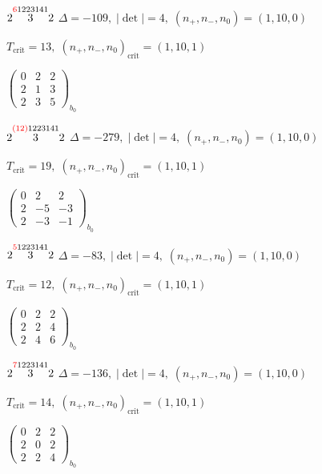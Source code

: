 \documentclass[10pt]{article}
\begin{document}
$2\overset{\textcolor{red}{6}1223141}{3}2$ \quad $\Delta=-109,\; |\det|=4,\; (n_+,n_-,n_0)=(1,10,0)$

\hspace{1em}$T_{\text{crit}}=13,\; (n_+,n_-,n_0)_{\text{crit}}=(1,10,1)$

\hspace{2em}$\left(\begin{smallmatrix}0 & 2 & 2 \\ 2 & 1 & 3 \\ 2 & 3 & 5\end{smallmatrix}\right)_{\!b_0}$

$2\overset{\textcolor{red}{(12)}1223141}{3}2$ \quad $\Delta=-279,\; |\det|=4,\; (n_+,n_-,n_0)=(1,10,0)$

\hspace{1em}$T_{\text{crit}}=19,\; (n_+,n_-,n_0)_{\text{crit}}=(1,10,1)$

\hspace{2em}$\left(\begin{smallmatrix}0 & 2 & 2 \\ 2 & -5 & -3 \\ 2 & -3 & -1\end{smallmatrix}\right)_{\!b_0}$

$2\overset{\textcolor{red}{5}1223141}{3}2$ \quad $\Delta=-83,\; |\det|=4,\; (n_+,n_-,n_0)=(1,10,0)$

\hspace{1em}$T_{\text{crit}}=12,\; (n_+,n_-,n_0)_{\text{crit}}=(1,10,1)$

\hspace{2em}$\left(\begin{smallmatrix}0 & 2 & 2 \\ 2 & 2 & 4 \\ 2 & 4 & 6\end{smallmatrix}\right)_{\!b_0}$

$2\overset{\textcolor{red}{7}1223141}{3}2$ \quad $\Delta=-136,\; |\det|=4,\; (n_+,n_-,n_0)=(1,10,0)$

\hspace{1em}$T_{\text{crit}}=14,\; (n_+,n_-,n_0)_{\text{crit}}=(1,10,1)$

\hspace{2em}$\left(\begin{smallmatrix}0 & 2 & 2 \\ 2 & 0 & 2 \\ 2 & 2 & 4\end{smallmatrix}\right)_{\!b_0}$

\smallskip
\end{document}
